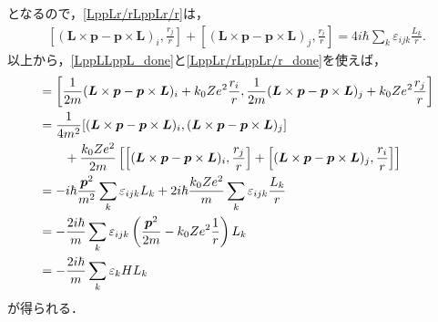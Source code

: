 となるので，\eqref{LppLr/rLppLr/r}は，
\begin{align}
  \left[(\boldsymbol{L}\times\boldsymbol{p} - \boldsymbol{p}\times\boldsymbol{L})_i,\frac{r_j}{r}\right] + \left[(\boldsymbol{L}\times\boldsymbol{p} - \boldsymbol{p}\times\boldsymbol{L})_j,\frac{r_i}{r}\right]= 4i\hbar\sum_k\varepsilon_{ijk}\frac{L_k}{r}.\label{LppLr/rLppLr/r_done}
\end{align}
以上から，\eqref{LppLLppL_done}と\eqref{LppLr/rLppLr/r_done}を使えば，
\begin{align}
  [R_i,R_j] & = \left[\frac{1}{2m}(\boldsymbol{L}\times\boldsymbol{p} - \boldsymbol{p}\times\boldsymbol{L})_i + k_0Ze^2\frac{r_i}{r},\frac{1}{2m}(\boldsymbol{L}\times\boldsymbol{p} - \boldsymbol{p}\times\boldsymbol{L})_j + k_0Ze^2\frac{r_j}{r}\right]\notag\\
  & = \frac{1}{4m^2} [(\boldsymbol{L}\times\boldsymbol{p} - \boldsymbol{p}\times\boldsymbol{L})_i,(\boldsymbol{L}\times\boldsymbol{p} - \boldsymbol{p}\times\boldsymbol{L})_j] \\
  & \qquad + \frac{k_0Ze^2}{2m}\left[ \left[(\boldsymbol{L}\times\boldsymbol{p} - \boldsymbol{p}\times\boldsymbol{L})_i,\frac{r_j}{r}\right] + \left[(\boldsymbol{L}\times\boldsymbol{p} - \boldsymbol{p}\times\boldsymbol{L})_j,\frac{r_i}{r}\right]\right]\notag\\
  & = - i\hbar\frac{\boldsymbol{p}^2}{m^2}\sum_k\varepsilon_{ijk}L_k + 2i\hbar\frac{k_0Ze^2}{m}\sum_k\varepsilon_{ijk}\frac{L_k}{r}\notag\\
  & = - \frac{2i\hbar}{m}\sum_k\varepsilon_{ijk}\left(\frac{\boldsymbol{p}^2}{2m} - k_0Ze^2\frac{1}{r}\right)L_k\notag\\
  & = - \frac{2i\hbar}{m}\sum_k\varepsilon_kHL_k
\end{align}
が得られる．

